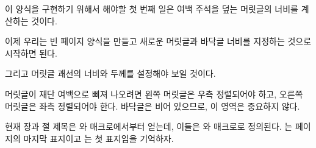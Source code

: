 이 양식을 구현하기 위해서 해야할 첫 번째 일은 여백 주석을
덮는 머릿글의 너비를 계산하는 것이다.
\begin{lcode}
\setlength{\headwidth}{\textwidth}
  \addtolength{\headwidth}{\marginparsep}
  \addtolength{\headwidth}{\marginparwidth}
\end{lcode}
이제 우리는 빈  페이지 양식을 만들고 새로운
머릿글과 바닥글 너비를 지정하는 것으로
시작하면 된다.
\begin{lcode}
\end{lcode}
그리고 머릿글 괘선의 너비와 두께를 설정해야 보일 것이다.
\begin{lcode}
\end{lcode}

머릿글이 재단 여백으로 삐져 나오려면 왼쪽
머릿글은 우측 정렬되어야 하고, 오른쪽
머릿글은 좌측 정렬되어야 한다.
바닥글은 비어 있으므로, 이 영역은 중요하지 않다.
\begin{lcode}
\end{lcode}

현재 장과 절 제목은 \cmd{\leftmark}와 \cmd{\rightmark} 매크로에서부터 얻는데,
이들은 \cmd{\chaptermark}와 \cmd{\sectionmark} 매크로로 정의된다.
\cmd{\leftmark}는 페이지의 마지막  표지이고 \cmd{\rightmark}는 첫
 표지임을 기억하자.

